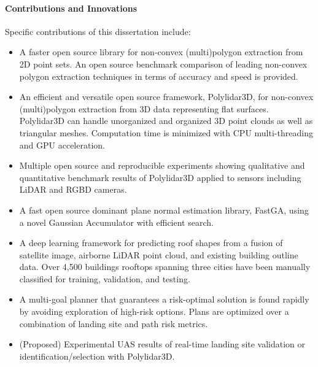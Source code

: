 \paragraph{Contributions and Innovations \\}
Specific contributions of this dissertation include: %

\begin{itemize}[noitemsep]
  \item A faster open source library for non-convex (multi)polygon extraction from 2D point sets. An open source benchmark comparison of leading non-convex polygon extraction techniques in terms of accuracy and speed is provided. %
  \item An efficient and versatile open source framework, Polylidar3D,  for non-convex (multi)polygon extraction from 3D data representing flat surfaces. Polylidar3D can handle unorganized and organized 3D point clouds as well as triangular meshes. Computation time is minimized with CPU multi-threading and GPU acceleration. %
  \item Multiple open source and reproducible experiments showing qualitative and quantitative benchmark results of Polylidar3D applied to sensors including LiDAR and RGBD cameras.
  \item A fast open source dominant plane normal estimation library, FastGA,  using a novel Gaussian Accumulator with efficient search.
  \item A deep learning framework for predicting roof shapes from a fusion of satellite image, airborne LiDAR point cloud, and existing building outline data. Over 4,500 buildings rooftops spanning three cities have been manually classified  for training, validation, and testing.
  \item A multi-goal planner that guarantees a risk-optimal solution is found rapidly by avoiding exploration of high-risk options. Plans are optimized over a combination of landing site and path risk metrics.
  \item (Proposed) Experimental UAS results of real-time landing site validation or identification/selection with Polylidar3D.
\end{itemize}
 

